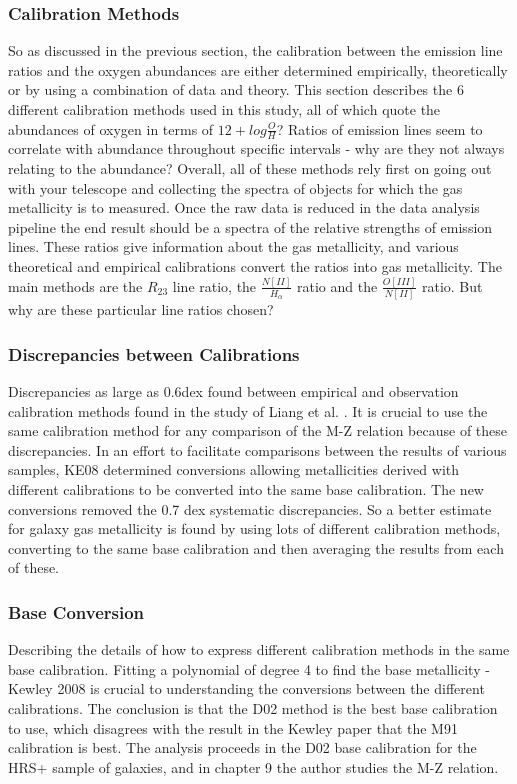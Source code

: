 \documentclass{literature}
\begin{document}
\subsubsection{Calibration Methods}
So as discussed in the previous section, the calibration between the emission line ratios and the oxygen abundances are either determined empirically, theoretically or by using a combination of data and theory. This section describes the 6 different calibration methods used in this study, all of which quote the abundances of oxygen in terms of $12 + log\frac{O}{H}$? Ratios of emission lines seem to correlate with abundance throughout specific intervals - why are they not always relating to the abundance? Overall, all of these methods rely first on going out with your telescope and collecting the spectra of objects for which the gas metallicity is to measured. Once the raw data is reduced in the data analysis pipeline the end result should be a spectra of the relative strengths of emission lines. These ratios give information about the gas metallicity, and various theoretical and empirical calibrations convert the ratios into gas metallicity. The main methods are the $R_{23}$ line ratio, the $\frac{N[II]}{H_{\alpha}}$ ratio and the $\frac{O[III]}{N[II]}$ ratio. But why are these particular line ratios chosen? 

\subsubsection{Discrepancies between Calibrations}
Discrepancies as large as 0.6dex found between empirical and observation calibration methods found in the study of Liang et al. \citep{Liang_2006}. It is crucial to use the same calibration method for any comparison of the M-Z relation because of these discrepancies. In an effort to facilitate comparisons between the results of various samples, KE08 determined conversions allowing metallicities derived with different calibrations to be converted into the same base calibration. The new conversions removed the 0.7 dex systematic discrepancies. So a better estimate for galaxy gas metallicity is found by using lots of different calibration methods, converting to the same base calibration and then averaging the results from each of these.

\subsubsection{Base Conversion}
Describing the details of how to express different calibration methods in the same base calibration. Fitting a polynomial of degree 4 to find the base metallicity - Kewley 2008 \citep{Kewley_2008} is crucial to understanding the conversions between the different calibrations. The conclusion is that the D02 method is the best base calibration to use, which disagrees with the result in the Kewley paper that the M91 calibration is best. The analysis proceeds in the D02 base calibration for the HRS+ sample of galaxies, and in chapter 9 the author studies the M-Z relation.
\end{document}
